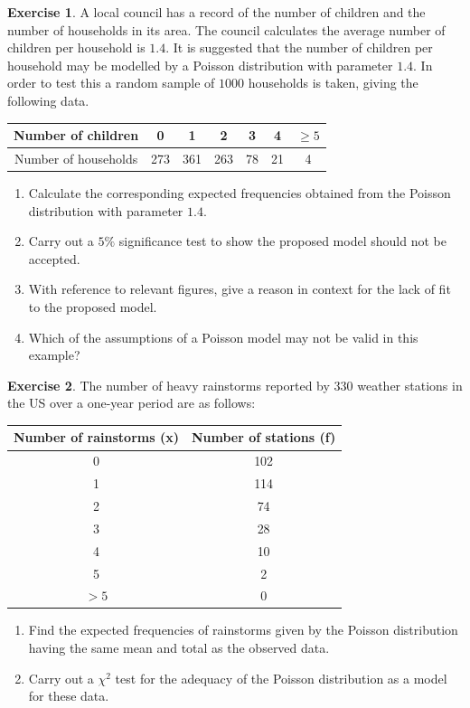 \documentclass[
]{book}
\theoremstyle{definition}
\theoremstyle{definition}
\theoremstyle{definition}
\newtheorem{exercise}{Exercise}[chapter]
\theoremstyle{definition}
\theoremstyle{remark}
\begin{document}
\begin{exercise}

A local council has a record of the number of children and the number of households in its area. The council calculates the average number of children per household is \(1.4\). It is suggested that the number of children per household may be modelled by a Poisson distribution with parameter \(1.4\). In order to test this a random sample of \(1000\) households is taken, giving the following data.

\begin{longtable}[]{@{}ccccccc@{}}
\toprule
Number of children & 0 & 1 & 2 & 3 & 4 & \(\geq 5\)\tabularnewline
\midrule
\endhead
Number of households & 273 & 361 & 263 & 78 & 21 & 4\tabularnewline
\bottomrule
\end{longtable}

\begin{enumerate}
\def\labelenumi{\alph{enumi})}
\item
  Calculate the corresponding expected frequencies obtained from the Poisson distribution with parameter \(1.4\).
\item
  Carry out a \(5\%\) significance test to show the proposed model should not be accepted.
\item
  With reference to relevant figures, give a reason in context for the lack of fit to the proposed model.
\item
  Which of the assumptions of a Poisson model may not be valid in this example?
\end{enumerate}

\end{exercise}

\begin{exercise}

The number of heavy rainstorms reported by \(330\) weather stations in the US over a one-year period are as follows:

\begin{longtable}[]{@{}cc@{}}
\toprule
Number of rainstorms (x) & Number of stations (f)\tabularnewline
\midrule
\endhead
0 & 102\tabularnewline
1 & 114\tabularnewline
2 & 74\tabularnewline
3 & 28\tabularnewline
4 & 10\tabularnewline
5 & 2\tabularnewline
\(> 5\) & 0\tabularnewline
\bottomrule
\end{longtable}

\begin{enumerate}
\def\labelenumi{\alph{enumi})}
\item
  Find the expected frequencies of rainstorms given by the Poisson distribution having the same mean and total as the observed data.
\item
  Carry out a \(\chi^2\) test for the adequacy of the Poisson distribution as a model for these data.
\end{enumerate}

\end{exercise}
\end{document}
